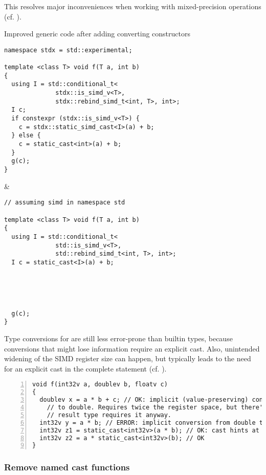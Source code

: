 This resolves major inconveniences when working with mixed-precision
operations (cf. ).
\begin{tonytable}[Parallelism TS 2]{Improved generic code after adding converting constructors}\label{tt:better with conv ctors}
  \begin{lstlisting}
namespace stdx = std::experimental;

template <class T> void f(T a, int b)
{
  using I = std::conditional_t<
              stdx::is_simd_v<T>,
              stdx::rebind_simd_t<int, T>, int>;
  I c;
  if constexpr (stdx::is_simd_v<T>) {
    c = stdx::static_simd_cast<I>(a) + b;
  } else {
    c = static_cast<int>(a) + b;
  }
  g(c);
}
  \end{lstlisting}
  &
  \begin{lstlisting}
// assuming simd in namespace std

template <class T> void f(T a, int b)
{
  using I = std::conditional_t<
              std::is_simd_v<T>,
              std::rebind_simd_t<int, T>, int>;
  I c = static_cast<I>(a) + b;





  g(c);
}
  \end{lstlisting}
\end{tonytable}%
Type conversions for  are still less error-prone than builtin types,
because conversions that might lose information require an explicit cast.
Also, unintended widening of the SIMD register size can happen, but typically
leads to the need for an explicit cast in the complete statement (cf.
).

\begin{lstlisting}[numbers=left,float={hbtp},label=lst:mixedprecision,caption={
  Mixed precision code using the types from \lst{lst:simdtypespattern}, ensuring equal element count
}]
void f(int32v a, doublev b, floatv c)
{
  doublev x = a * b + c; // OK: implicit (value-preserving) conversion from int and float
    // to double. Requires twice the register space, but there's no way around it and the
    // result type requires it anyway.
  int32v y = a * b; // ERROR: implicit conversion from double to int not value-preserving
  int32v z1 = static_cast<int32v>(a * b); // OK: cast hints at implicit register widening
  int32v z2 = a * static_cast<int32v>(b); // OK
}
\end{lstlisting}

\subsubsection{Remove named cast functions}

